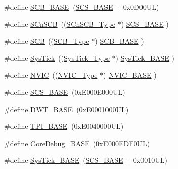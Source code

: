 \begin{DoxyCompactItemize}
\item 
\#define \hyperlink{group___c_m_s_i_s__core__base_gad55a7ddb8d4b2398b0c1cfec76c0d9fd}{S\+C\+B\+\_\+\+B\+A\+SE}~(\hyperlink{group___c_m_s_i_s__core__base_ga3c14ed93192c8d9143322bbf77ebf770}{S\+C\+S\+\_\+\+B\+A\+SE} +  0x0\+D00\+U\+L)
\item 
\#define \hyperlink{group___c_m_s_i_s__core__base_ga9fe0cd2eef83a8adad94490d9ecca63f}{S\+Cn\+S\+CB}~((\hyperlink{struct_s_cn_s_c_b___type}{S\+Cn\+S\+C\+B\+\_\+\+Type}    $\ast$)     \hyperlink{group___c_m_s_i_s__core__base_ga3c14ed93192c8d9143322bbf77ebf770}{S\+C\+S\+\_\+\+B\+A\+SE}      )
\item 
\#define \hyperlink{group___c_m_s_i_s__core__base_gaaaf6477c2bde2f00f99e3c2fd1060b01}{S\+CB}~((\hyperlink{struct_s_c_b___type}{S\+C\+B\+\_\+\+Type}       $\ast$)     \hyperlink{group___c_m_s_i_s__core__base_gad55a7ddb8d4b2398b0c1cfec76c0d9fd}{S\+C\+B\+\_\+\+B\+A\+SE}      )
\item 
\#define \hyperlink{group___c_m_s_i_s__core__base_gacd96c53beeaff8f603fcda425eb295de}{Sys\+Tick}~((\hyperlink{struct_sys_tick___type}{Sys\+Tick\+\_\+\+Type}   $\ast$)     \hyperlink{group___c_m_s_i_s__core__base_ga58effaac0b93006b756d33209e814646}{Sys\+Tick\+\_\+\+B\+A\+SE}  )
\item 
\#define \hyperlink{group___c_m_s_i_s__core__base_gac8e97e8ce56ae9f57da1363a937f8a17}{N\+V\+IC}~((\hyperlink{struct_n_v_i_c___type}{N\+V\+I\+C\+\_\+\+Type}      $\ast$)     \hyperlink{group___c_m_s_i_s__core__base_gaa0288691785a5f868238e0468b39523d}{N\+V\+I\+C\+\_\+\+B\+A\+SE}     )
\item 
\#define \hyperlink{group___c_m_s_i_s__core__base_ga3c14ed93192c8d9143322bbf77ebf770}{S\+C\+S\+\_\+\+B\+A\+SE}~(0x\+E000\+E000\+U\+L)
\item 
\#define \hyperlink{group___c_m_s_i_s__core__base_gafdab534f961bf8935eb456cb7700dcd2}{D\+W\+T\+\_\+\+B\+A\+SE}~(0x\+E0001000\+U\+L)
\item 
\#define \hyperlink{group___c_m_s_i_s__core__base_ga2b1eeff850a7e418844ca847145a1a68}{T\+P\+I\+\_\+\+B\+A\+SE}~(0x\+E0040000\+U\+L)
\item 
\#define \hyperlink{group___c_m_s_i_s__core__base_ga680604dbcda9e9b31a1639fcffe5230b}{Core\+Debug\+\_\+\+B\+A\+SE}~(0x\+E000\+E\+D\+F0\+U\+L)
\item 
\#define \hyperlink{group___c_m_s_i_s__core__base_ga58effaac0b93006b756d33209e814646}{Sys\+Tick\+\_\+\+B\+A\+SE}~(\hyperlink{group___c_m_s_i_s__core__base_ga3c14ed93192c8d9143322bbf77ebf770}{S\+C\+S\+\_\+\+B\+A\+SE} +  0x0010\+U\+L)

\end{DoxyCompactItemize}
